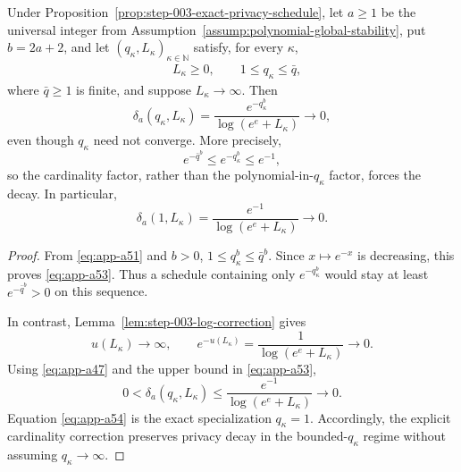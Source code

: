 \begin{proposition}
\label{prop:step-003-bounded-q-activation}
Under Proposition~\ref{prop:step-003-exact-privacy-schedule}, let
\(a\geq1\) be the universal integer from
Assumption~\ref{assump:polynomial-global-stability}, put \(b=2a+2\),
and let \((q_\kappa,L_\kappa)_{\kappa\in\mathbb N}\) satisfy, for
every \(\kappa\),
\begin{equation}
\begin{aligned}
&L_\kappa\geq0,\qquad 1\leq q_\kappa\leq\bar q,
\end{aligned}
\label{eq:app-a51}
\end{equation}
where \(\bar q\geq1\) is finite, and suppose
\(L_\kappa\to\infty\).  Then
\begin{equation}
\delta_a(q_\kappa,L_\kappa)
=\frac{e^{-q_\kappa^b}}{\log(e^e+L_\kappa)}
\longrightarrow0,
\label{eq:app-a52}
\end{equation}
even though \(q_\kappa\) need not converge.  More precisely,
\begin{equation}
e^{-\bar q^b}\leq e^{-q_\kappa^b}\leq e^{-1},
\label{eq:app-a53}
\end{equation}
so the cardinality factor, rather than the polynomial-in-\(q_\kappa\)
factor, forces the decay.  In particular,
\begin{equation}
\delta_a(1,L_\kappa)
=\frac{e^{-1}}{\log(e^e+L_\kappa)}
\longrightarrow0.
\label{eq:app-a54}
\end{equation}
\end{proposition}

\begin{proof}
From \eqref{eq:app-a51} and \(b>0\),
\(1\leq q_\kappa^b\leq\bar q^b\).  Since \(x\mapsto e^{-x}\) is
decreasing, this proves \eqref{eq:app-a53}.  Thus a schedule containing only
\(e^{-q_\kappa^b}\) would stay at least
\(e^{-\bar q^b}>0\) on this sequence.

In contrast, Lemma~\ref{lem:step-003-log-correction} gives
\begin{equation}
u(L_\kappa)\to\infty,\qquad
e^{-u(L_\kappa)}
=\frac1{\log(e^e+L_\kappa)}
\longrightarrow0.
\label{eq:app-a55}
\end{equation}
Using \eqref{eq:app-a47} and the upper bound in \eqref{eq:app-a53},
\begin{equation}
0<\delta_a(q_\kappa,L_\kappa)
\leq\frac{e^{-1}}{\log(e^e+L_\kappa)}
\longrightarrow0.
\label{eq:app-a56}
\end{equation}
Equation \eqref{eq:app-a54} is the exact specialization \(q_\kappa=1\).
Accordingly, the explicit cardinality correction preserves privacy
decay in the bounded-\(q_\kappa\) regime without assuming
\(q_\kappa\to\infty\).
\end{proof}

